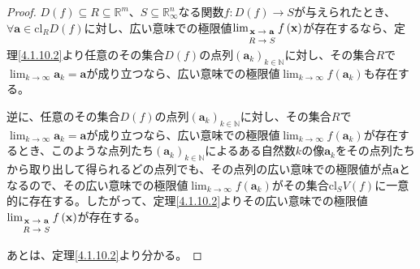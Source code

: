 \documentclass[dvipdfmx]{jsarticle}
\begin{document}
\begin{proof}
$D(f) \subseteq R \subseteq \mathbb{R}^{m}$、$S \subseteq \mathbb{R}_{\infty}^{n}$なる関数$f:D(f) \rightarrow S$が与えられたとき、$\forall\mathbf{a} \in \mathrm{cl}_{R}{D(f)}$に対し、広い意味での極限値$\lim_{\scriptsize \begin{matrix} \mathbf{x} \rightarrow \mathbf{a} \\ R \rightarrow S \\\end{matrix}}{f\left( \mathbf{x} \right)}$が存在するなら、定理\ref{4.1.10.2}より任意のその集合$D(f)$の点列$\left( \mathbf{a}_{k} \right)_{k \in \mathbb{N}}$に対し、その集合$R$で$\lim_{k \rightarrow \infty}\mathbf{a}_{k} = \mathbf{a}$が成り立つなら、広い意味での極限値$\lim_{k \rightarrow \infty}{f\left( \mathbf{a}_{k} \right)}$も存在する。\par
逆に、任意のその集合$D(f)$の点列$\left( \mathbf{a}_{k} \right)_{k \in \mathbb{N}}$に対し、その集合$R$で$\lim_{k \rightarrow \infty}\mathbf{a}_{k} = \mathbf{a}$が成り立つなら、広い意味での極限値$\lim_{k \rightarrow \infty}{f\left( \mathbf{a}_{k} \right)}$が存在するとき、このような点列たち$\left( \mathbf{a}_{k} \right)_{k \in \mathbb{N}}$によるある自然数$k$の像$\mathbf{a}_{k}$をその点列たちから取り出して得られるどの点列でも、その点列の広い意味での極限値が点$\mathbf{a}$となるので、その広い意味での極限値$\lim_{k \rightarrow \infty}{f\left( \mathbf{a}_{k} \right)}$がその集合$\mathrm{cl}_{S}{V(f)}$に一意的に存在する。したがって、定理\ref{4.1.10.2}よりその広い意味での極限値$\lim_{\scriptsize \begin{matrix} \mathbf{x} \rightarrow \mathbf{a} \\ R \rightarrow S \\\end{matrix}}{f\left( \mathbf{x} \right)}$が存在する。\par
あとは、定理\ref{4.1.10.2}より分かる。
\end{proof}
\end{document}
